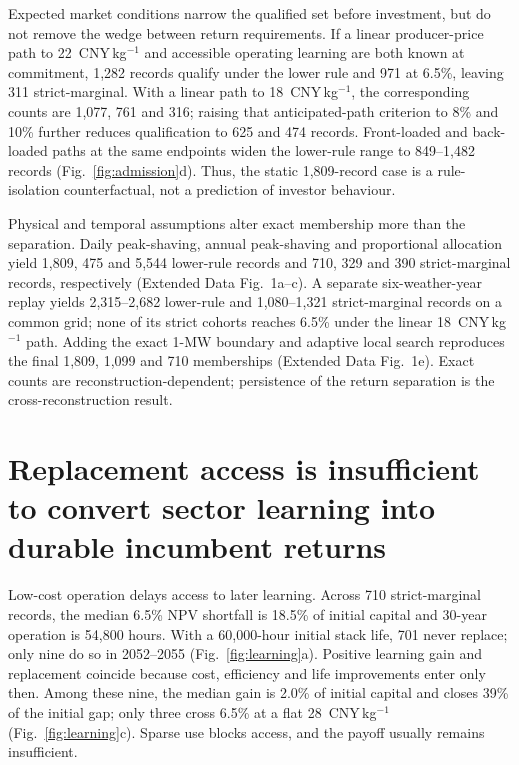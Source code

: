 \documentclass[lineno,pdflatex,sn-nature]{sn-jnl}
\newcommand{\cnykg}{CNY\,kg$^{-1}$}
\begin{document}
Expected market conditions narrow the qualified set before investment, but do not remove the wedge between return requirements. If a linear producer-price path to 22~\cnykg{} and accessible operating learning are both known at commitment, 1,282 records qualify under the lower rule and 971 at 6.5\%, leaving 311 strict-marginal. With a linear path to 18~\cnykg{}, the corresponding counts are 1,077, 761 and 316; raising that anticipated-path criterion to 8\% and 10\% further reduces qualification to 625 and 474 records. Front-loaded and back-loaded paths at the same endpoints widen the lower-rule range to 849--1,482 records (Fig.~\ref{fig:admission}d). Thus, the static 1,809-record case is a rule-isolation counterfactual, not a prediction of investor behaviour.

Physical and temporal assumptions alter exact membership more than the separation. Daily peak-shaving, annual peak-shaving and proportional allocation yield 1,809, 475 and 5,544 lower-rule records and 710, 329 and 390 strict-marginal records, respectively (Extended Data Fig.~1a--c). A separate six-weather-year replay yields 2,315--2,682 lower-rule and 1,080--1,321 strict-marginal records on a common grid; none of its strict cohorts reaches 6.5\% under the linear 18~\cnykg{} path. Adding the exact 1-MW boundary and adaptive local search reproduces the final 1,809, 1,099 and 710 memberships (Extended Data Fig.~1e). Exact counts are reconstruction-dependent; persistence of the return separation is the cross-reconstruction result.

\section*{Replacement access is insufficient to convert sector learning into durable incumbent returns}

Low-cost operation delays access to later learning. Across 710 strict-marginal records, the median 6.5\% NPV shortfall is 18.5\% of initial capital and 30-year operation is 54,800 hours. With a 60,000-hour initial stack life, 701 never replace; only nine do so in 2052--2055 (Fig.~\ref{fig:learning}a). Positive learning gain and replacement coincide because cost, efficiency and life improvements enter only then. Among these nine, the median gain is 2.0\% of initial capital and closes 39\% of the initial gap; only three cross 6.5\% at a flat 28~\cnykg{} (Fig.~\ref{fig:learning}c). Sparse use blocks access, and the payoff usually remains insufficient.
\end{document}
